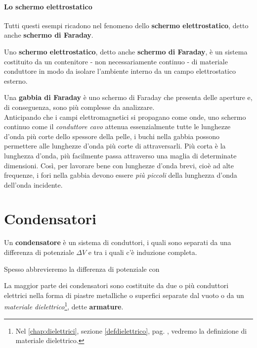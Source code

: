\paragraph{Lo schermo elettrostatico}
Tutti questi esempi ricadono nel fenomeno dello \textbf{schermo elettrostatico}, detto anche \textbf{schermo di Faraday}.
\begin{define}
	Uno \textbf{schermo elettrostatico}, detto anche \textbf{schermo di Faraday}, è un sistema costituito da un contenitore - non necessariamente continuo - di materiale conduttore in modo da isolare l'ambiente interno da un campo elettrostatico esterno.
\end{define}
\begin{digressionwt}
	Una \textbf{gabbia di Faraday} è uno schermo di Faraday che presenta delle aperture e, di conseguenza, sono più complesse da analizzare.\\
	Anticipando che i campi elettromagnetici si propagano come onde, uno schermo continuo come il \textit{conduttore cavo} attenua essenzialmente tutte le lunghezze d'onda più corte dello spessore della pelle, i buchi nella gabbia possono permettere alle lunghezze d'onda più corte di attraversarli. Più corta è la lunghezza d'onda, più facilmente passa attraverso una maglia di determinate dimensioni. Così, per lavorare bene con lunghezze d'onda brevi, cioè ad alte frequenze, i fori nella gabbia devono essere \textit{più piccoli} della lunghezza d'onda dell'onda incidente.
\end{digressionwt}
\section{Condensatori}
\begin{define}[Condensatore]
	Un \textbf{condensatore} è un sistema di conduttori, i quali sono separati da una differenza di potenziale $\Delta V$ e tra i quali c'è induzione completa.
\end{define}
\begin{notate}
	Spesso abbrevieremo la differenza di potenziale con \ddp
\end{notate}
La maggior parte dei condensatori sono costituite da due o più conduttori elettrici nella forma di piastre metalliche o superfici separate dal vuoto o da un \textit{materiale dielettrico}\footnote{Nel \autoref{chap:dielettrici}, sezione \ref{defdielettrico}, pag. \pageref{defdielettrico}, vedremo la definizione di materiale dielettrico.}, dette \textbf{armature}.

